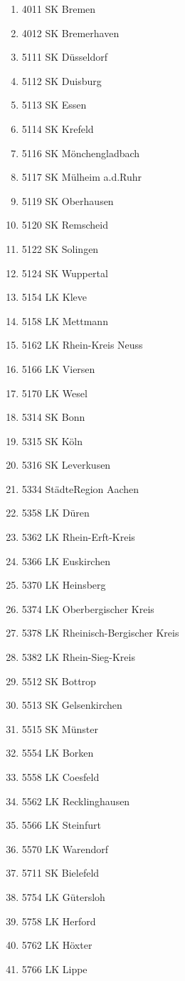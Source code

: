 \begin{enumerate}[itemsep=-6mm]
\item 4011 SK Bremen
\item 4012 SK Bremerhaven
\item 5111 SK Düsseldorf
\item 5112 SK Duisburg
\item 5113 SK Essen
\item 5114 SK Krefeld
\item 5116 SK Mönchengladbach
\item 5117 SK Mülheim a.d.Ruhr
\item 5119 SK Oberhausen
\item 5120 SK Remscheid
\item 5122 SK Solingen
\item 5124 SK Wuppertal
\item 5154 LK Kleve
\item 5158 LK Mettmann
\item 5162 LK Rhein-Kreis Neuss
\item 5166 LK Viersen
\item 5170 LK Wesel
\item 5314 SK Bonn
\item 5315 SK Köln
\item 5316 SK Leverkusen
\item 5334 StädteRegion Aachen
\item 5358 LK Düren
\item 5362 LK Rhein-Erft-Kreis
\item 5366 LK Euskirchen
\item 5370 LK Heinsberg
\item 5374 LK Oberbergischer Kreis
\item 5378 LK Rheinisch-Bergischer Kreis
\item 5382 LK Rhein-Sieg-Kreis
\item 5512 SK Bottrop
\item 5513 SK Gelsenkirchen
\item 5515 SK Münster
\item 5554 LK Borken
\item 5558 LK Coesfeld
\item 5562 LK Recklinghausen
\item 5566 LK Steinfurt
\item 5570 LK Warendorf
\item 5711 SK Bielefeld
\item 5754 LK Gütersloh
\item 5758 LK Herford
\item 5762 LK Höxter
\item 5766 LK Lippe

\end{enumerate}
